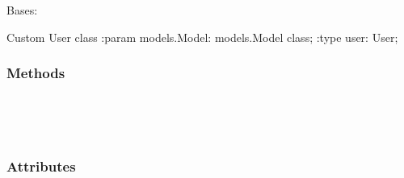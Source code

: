 \documentclass[letterpaper,10pt,english]{sphinxmanual}
\begin{document}
\begin{fulllineitems}
\label{\detokenize{vtcvlp:vtcuser.models.CustomUser}}
Bases: 

Custom User class
:param models.Model: models.Model class;
:type user: User;
\subsubsection*{Methods}


\begin{savenotes}\sphinxatlongtablestart\begin{longtable}[c]{}
\hline

\endfirsthead

%
{}\\
\hline

\endhead

\hline
{}\\
\endfoot

\endlastfoot

\end{longtable}\sphinxatlongtableend\end{savenotes}
\subsubsection*{Attributes}


\begin{savenotes}\sphinxatlongtablestart\begin{longtable}[c]{}
\hline

\endfirsthead

%
{}\\
\hline

\endhead

\hline
{}\\
\endfoot


\end{longtable}
\end{savenotes}
\end{fulllineitems}
\end{document}
